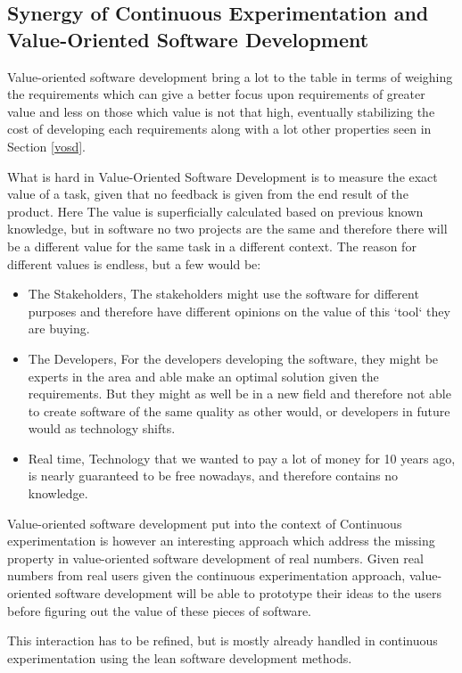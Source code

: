 \documentclass{sig-alternate}
\begin{document}
\subsection{Synergy of Continuous Experimentation  and Value-Oriented Software Development}
\label{dis:synery}
Value-oriented software development bring a lot to the table in terms of weighing the requirements 
which can give a better focus upon requirements of greater value and less on those which value is not
that high, eventually stabilizing the cost of developing each requirements along with a lot other properties 
seen in Section \ref{vosd}.

What is hard in Value-Oriented Software Development is to measure the exact value of a task, given that no
feedback is given from the end result of the product.
Here The value is superficially calculated based on previous known knowledge, but in software no two projects
are the same and therefore there will be a different value for the same task in a different context. 
The reason for different values is endless, but a few would be:
\begin{itemize}
\item The Stakeholders, The stakeholders might use the software for different purposes and therefore have
different opinions on the value of this `tool` they are buying.
\item The Developers, For the developers developing the software, they might be experts in the area and able
make an optimal solution given the requirements. But they might as well be in a new field and therefore 
not able to create software of the same quality as other would, or developers in future would as technology
shifts.
\item Real time, Technology that we wanted to pay a lot of money for 10 years ago, is nearly guaranteed to be 
free nowadays, and therefore contains no knowledge.
\end{itemize}

Value-oriented software development put into the context of Continuous experimentation is however an 
interesting approach which address the missing property in value-oriented software development of 
real numbers.
Given real numbers from real users given the continuous experimentation approach, value-oriented software 
development will be able to prototype their ideas to the users before figuring out the value of these 
pieces of software.

This interaction has to be refined, but is mostly already handled in continuous experimentation using the 
lean software development methods. 
\end{document}
